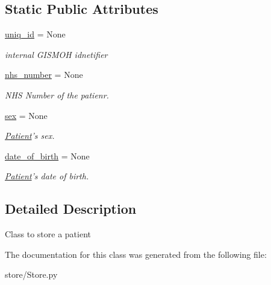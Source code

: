 \subsection*{Static Public Attributes}
\begin{DoxyCompactItemize}
\item 
\hypertarget{classstore_1_1_store_1_1_patient_a7ce52748fe80fbdd12ebb3ce4b880d28}{\hyperlink{classstore_1_1_store_1_1_patient_a7ce52748fe80fbdd12ebb3ce4b880d28}{uniq\-\_\-id} = None}\label{classstore_1_1_store_1_1_patient_a7ce52748fe80fbdd12ebb3ce4b880d28}

\begin{DoxyCompactList}\small\item\em internal G\-I\-S\-M\-O\-H idnetifier \end{DoxyCompactList}\item 
\hypertarget{classstore_1_1_store_1_1_patient_a124a3bd47ef0cc7bc7506db89bd7bf00}{\hyperlink{classstore_1_1_store_1_1_patient_a124a3bd47ef0cc7bc7506db89bd7bf00}{nhs\-\_\-number} = None}\label{classstore_1_1_store_1_1_patient_a124a3bd47ef0cc7bc7506db89bd7bf00}

\begin{DoxyCompactList}\small\item\em N\-H\-S Number of the patienr. \end{DoxyCompactList}\item 
\hypertarget{classstore_1_1_store_1_1_patient_a3ca202944df0822cb4c47afdbc083ed8}{\hyperlink{classstore_1_1_store_1_1_patient_a3ca202944df0822cb4c47afdbc083ed8}{sex} = None}\label{classstore_1_1_store_1_1_patient_a3ca202944df0822cb4c47afdbc083ed8}

\begin{DoxyCompactList}\small\item\em \hyperlink{classstore_1_1_store_1_1_patient}{Patient}'s sex. \end{DoxyCompactList}\item 
\hypertarget{classstore_1_1_store_1_1_patient_a9abe08afce1a9dae8ee8e9cd9f5da70e}{\hyperlink{classstore_1_1_store_1_1_patient_a9abe08afce1a9dae8ee8e9cd9f5da70e}{date\-\_\-of\-\_\-birth} = None}\label{classstore_1_1_store_1_1_patient_a9abe08afce1a9dae8ee8e9cd9f5da70e}

\begin{DoxyCompactList}\small\item\em \hyperlink{classstore_1_1_store_1_1_patient}{Patient}'s date of birth. \end{DoxyCompactList}\end{DoxyCompactItemize}


\subsection{Detailed Description}
\begin{DoxyVerb}Class to store a patient
\end{DoxyVerb}
 

The documentation for this class was generated from the following file\-:\begin{DoxyCompactItemize}
\item 
store/Store.\-py\end{DoxyCompactItemize}
